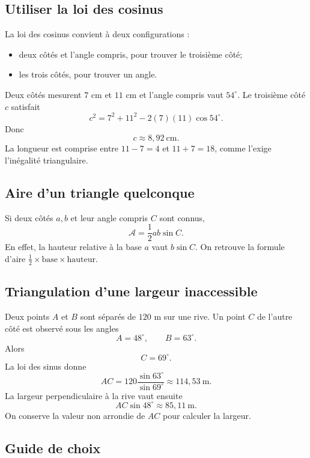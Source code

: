 \subsection{Utiliser la loi des cosinus}

La loi des cosinus convient à deux configurations :
\begin{itemize}
\item deux côtés et l'angle compris, pour trouver le troisième côté;
\item les trois côtés, pour trouver un angle.
\end{itemize}

\begin{examplebox}
Deux côtés mesurent $7$ cm et $11$ cm et l'angle compris vaut $54^\circ$. Le troisième côté $c$ satisfait
\[
c^2=7^2+11^2-2(7)(11)\cos54^\circ.
\]
Donc
\[
c\approx8{,}92\ \mathrm{cm}.
\]
La longueur est comprise entre $11-7=4$ et $11+7=18$, comme l'exige l'inégalité triangulaire.
\end{examplebox}

\subsection{Aire d'un triangle quelconque}

Si deux côtés $a,b$ et leur angle compris $C$ sont connus,
\[
\mathcal A=\frac12ab\sin C.
\]
En effet, la hauteur relative à la base $a$ vaut $b\sin C$. On retrouve la formule d'aire $\frac12\times\text{base}\times\text{hauteur}$.

\subsection{Triangulation d'une largeur inaccessible}

Deux points $A$ et $B$ sont séparés de $120$ m sur une rive. Un point $C$ de l'autre côté est observé sous les angles
\[
A=48^\circ,
\qquad B=63^\circ.
\]
Alors
\[
C=69^\circ.
\]
La loi des sinus donne
\[
AC=120\frac{\sin63^\circ}{\sin69^\circ}\approx114{,}53\ \mathrm{m}.
\]
La largeur perpendiculaire à la rive vaut ensuite
\[
AC\sin48^\circ\approx85{,}11\ \mathrm{m}.
\]
On conserve la valeur non arrondie de $AC$ pour calculer la largeur.

\subsection{Guide de choix}

